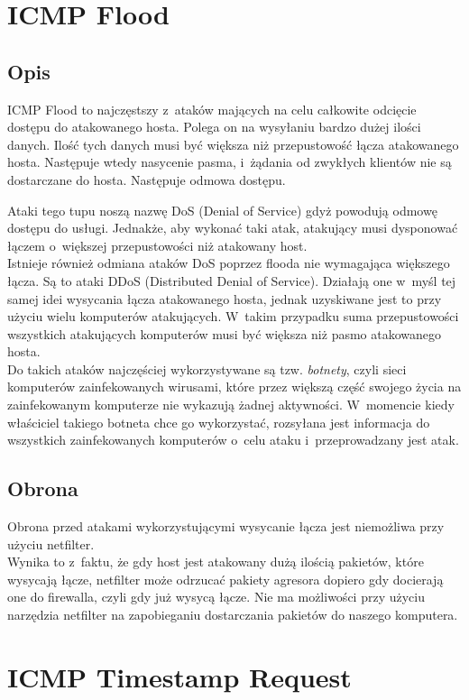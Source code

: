 \documentclass[a4paper,12pt]{book}
\begin{document}
	\section{ICMP Flood}
		\subsection{Opis}
			ICMP Flood to najczęstszy z~ataków mających na celu całkowite odcięcie dostępu do atakowanego hosta.
			Polega on na wysyłaniu bardzo dużej ilości danych. Ilość tych danych musi być większa niż przepustowość łącza atakowanego hosta.
			Następuje wtedy nasycenie pasma, i~żądania od zwykłych klientów nie są dostarczane do hosta.
			Następuje odmowa dostępu.
			
			Ataki tego tupu noszą nazwę DoS (Denial of Service) gdyż powodują odmowę dostępu do usługi.
			Jednakże, aby wykonać taki atak, atakujący musi dysponować łączem o~większej przepustowości niż atakowany host.\\
			Istnieje również odmiana ataków DoS poprzez flooda nie wymagająca większego łącza. Są to ataki DDoS (Distributed Denial of Service).
			Działają one w~myśl tej samej idei wysycania łącza atakowanego hosta, jednak uzyskiwane jest to przy użyciu wielu komputerów atakujących.
			W~takim przypadku suma przepustowości wszystkich atakujących komputerów musi być większa niż pasmo atakowanego hosta.\\
			Do takich ataków najczęściej wykorzystywane są tzw. \textit{botnet\dywiz y}, czyli sieci komputerów zainfekowanych wirusami,
			które przez większą część swojego życia na zainfekowanym komputerze nie wykazują żadnej aktywności.
			W~momencie kiedy właściciel takiego botneta chce go wykorzystać, rozsyłana jest informacja do wszystkich zainfekowanych komputerów o~celu ataku i~przeprowadzany jest atak.
		\subsection{Obrona}
			Obrona przed atakami wykorzystującymi wysycanie łącza jest niemożliwa przy użyciu netfilter.\\
			Wynika to z~faktu, że gdy host jest atakowany dużą ilością pakietów, które wysycają łącze, netfilter może odrzucać pakiety agresora dopiero gdy docierają one do firewalla,
			czyli gdy już wysycą łącze. Nie ma możliwości przy użyciu narzędzia netfilter na zapobieganiu dostarczania pakietów do naszego komputera.
	\section{ICMP Timestamp Request}
\end{document}
